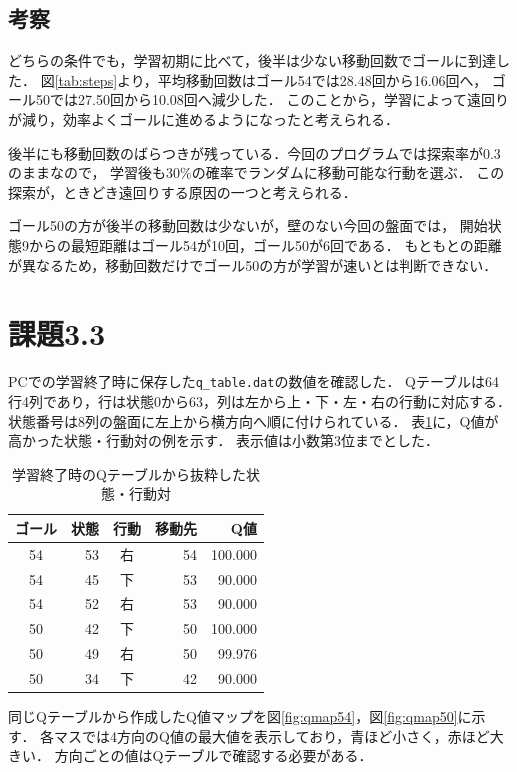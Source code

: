 \documentclass[a4paper,11pt]{ltjsarticle}
\begin{document}
\subsection*{考察}
どちらの条件でも，学習初期に比べて，後半は少ない移動回数でゴールに到達した．
図\ref{tab:steps}より，平均移動回数はゴール54では28.48回から16.06回へ，
ゴール50では27.50回から10.08回へ減少した．
このことから，学習によって遠回りが減り，効率よくゴールに進めるようになったと考えられる．

後半にも移動回数のばらつきが残っている．今回のプログラムでは探索率が0.3のままなので，
学習後も30\%の確率でランダムに移動可能な行動を選ぶ．
この探索が，ときどき遠回りする原因の一つと考えられる．

ゴール50の方が後半の移動回数は少ないが，壁のない今回の盤面では，
開始状態9からの最短距離はゴール54が10回，ゴール50が6回である．
もともとの距離が異なるため，移動回数だけでゴール50の方が学習が速いとは判断できない．

\clearpage
\section*{課題3.3}
PCでの学習終了時に保存した\texttt{q\_table.dat}の数値を確認した．
Qテーブルは64行4列であり，行は状態0から63，列は左から上・下・左・右の行動に対応する．
状態番号は8列の盤面に左上から横方向へ順に付けられている．
表\ref{tab:qvalues}に，Q値が高かった状態・行動対の例を示す．
表示値は小数第3位までとした．

\begin{table}[H]
\centering
\caption{学習終了時のQテーブルから抜粋した状態・行動対}
\label{tab:qvalues}
\begin{tabular}{crcrr}
\hline
ゴール & 状態 & 行動 & 移動先 & Q値 \\
\hline
54 & 53 & 右 & 54 & 100.000 \\
54 & 45 & 下 & 53 & 90.000 \\
54 & 52 & 右 & 53 & 90.000 \\
50 & 42 & 下 & 50 & 100.000 \\
50 & 49 & 右 & 50 & 99.976 \\
50 & 34 & 下 & 42 & 90.000 \\
\hline
\end{tabular}
\end{table}

同じQテーブルから作成したQ値マップを図\ref{fig:qmap54}，図\ref{fig:qmap50}に示す．
各マスでは4方向のQ値の最大値を表示しており，青ほど小さく，赤ほど大きい．
方向ごとの値はQテーブルで確認する必要がある．
\end{document}
